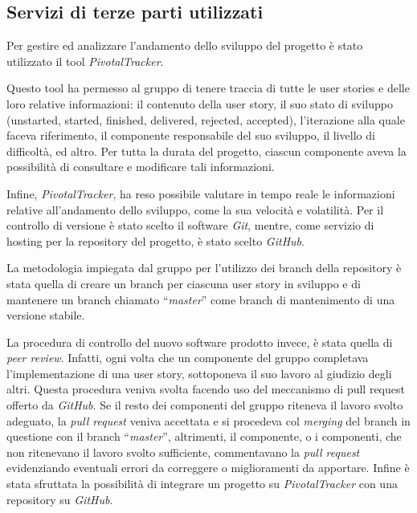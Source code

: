 \subsection{Servizi di terze parti utilizzati}

Per gestire ed analizzare l'andamento dello sviluppo del progetto è
stato utilizzato il tool \textit{PivotalTracker}.

Questo tool ha permesso al gruppo di tenere traccia di tutte le user
stories e delle loro relative informazioni: il contenuto della user
story, il suo stato di sviluppo (unstarted, started, finished, delivered,
rejected, accepted), l'iterazione alla quale faceva riferimento, il
componente responsabile del suo sviluppo, il livello di difficoltà, ed
altro. Per tutta la durata del progetto, ciascun componente aveva la
possibilità di consultare e modificare tali informazioni.

Infine, \textit{PivotalTracker}, ha reso possibile valutare in tempo
reale le informazioni relative all'andamento dello sviluppo, come la
sua velocità e volatilità.
\newline
\newline
Per il controllo di versione è stato scelto il software \textit{Git},
mentre, come servizio di hosting per la repository del progetto, è
stato scelto \textit{GitHub}.

La metodologia impiegata dal gruppo per l'utilizzo dei branch della
repository è stata quella di creare un branch per ciascuna user story
in sviluppo e di mantenere un branch chiamato ``\textit{master}'' come
branch di mantenimento di una versione stabile.

La procedura di controllo del nuovo software prodotto invece, è stata
quella di \textit{peer review}. Infatti, ogni volta che un componente
del gruppo completava l'implementazione di una user story, sottoponeva
il suo lavoro al giudizio degli altri. Questa procedura veniva svolta
facendo uso del meccanismo di pull request offerto da
\textit{GitHub}. Se il resto dei componenti del gruppo riteneva il
lavoro svolto adeguato, la \textit{pull request} veniva accettata e si
procedeva col \textit{merging} del branch in questione con il branch
``\textit{master}'', altrimenti, il componente, o i componenti, che
non ritenevano il lavoro svolto sufficiente, commentavano la
\textit{pull request} evidenziando eventuali errori da correggere o
miglioramenti da apportare.
\newline
\newline
Infine è stata sfruttata la possibilità di integrare un progetto su
\textit{PivotalTracker} con una repository su \textit{GitHub}.

